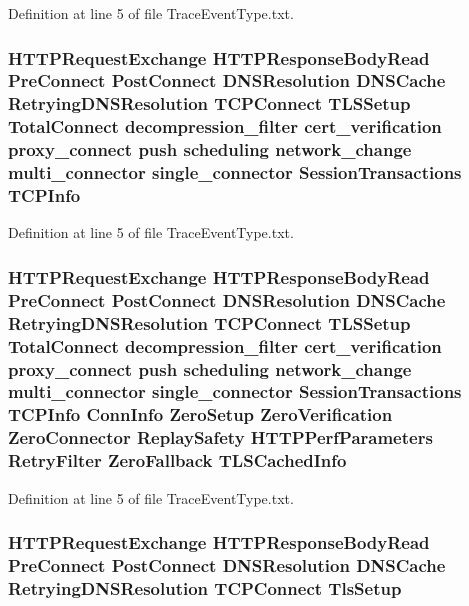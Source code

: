 Definition at line 5 of file Trace\+Event\+Type.\+txt.

\subsubsection[{T\+C\+P\+Info}]{ H\+T\+T\+P\+Request\+Exchange H\+T\+T\+P\+Response\+Body\+Read {\bf Pre\+Connect} {\bf Post\+Connect} D\+N\+S\+Resolution D\+N\+S\+Cache Retrying\+D\+N\+S\+Resolution T\+C\+P\+Connect T\+L\+S\+Setup {\bf Total\+Connect} decompression\+\_\+filter cert\+\_\+verification proxy\+\_\+connect push scheduling network\+\_\+change multi\+\_\+connector single\+\_\+connector {\bf Session\+Transactions} T\+C\+P\+Info}\label{TraceEventType_8txt_a618cdbad0e48db05a23a4934e989374e}


Definition at line 5 of file Trace\+Event\+Type.\+txt.

\subsubsection[{T\+L\+S\+Cached\+Info}]{ H\+T\+T\+P\+Request\+Exchange H\+T\+T\+P\+Response\+Body\+Read {\bf Pre\+Connect} {\bf Post\+Connect} D\+N\+S\+Resolution D\+N\+S\+Cache Retrying\+D\+N\+S\+Resolution T\+C\+P\+Connect T\+L\+S\+Setup {\bf Total\+Connect} decompression\+\_\+filter cert\+\_\+verification proxy\+\_\+connect push scheduling network\+\_\+change multi\+\_\+connector single\+\_\+connector {\bf Session\+Transactions} {\bf T\+C\+P\+Info} {\bf Conn\+Info} {\bf Zero\+Setup} {\bf Zero\+Verification} {\bf Zero\+Connector} {\bf Replay\+Safety} {\bf H\+T\+T\+P\+Perf\+Parameters} {\bf Retry\+Filter} {\bf Zero\+Fallback} T\+L\+S\+Cached\+Info}\label{TraceEventType_8txt_a6186b88632d9ef0c3c552f51e317f4a2}


Definition at line 5 of file Trace\+Event\+Type.\+txt.

\subsubsection[{Tls\+Setup}]{ H\+T\+T\+P\+Request\+Exchange H\+T\+T\+P\+Response\+Body\+Read {\bf Pre\+Connect} {\bf Post\+Connect} D\+N\+S\+Resolution D\+N\+S\+Cache Retrying\+D\+N\+S\+Resolution T\+C\+P\+Connect Tls\+Setup}\label{TraceEventType_8txt_a356db425684689a6a387ce8bac4ee0b9}


